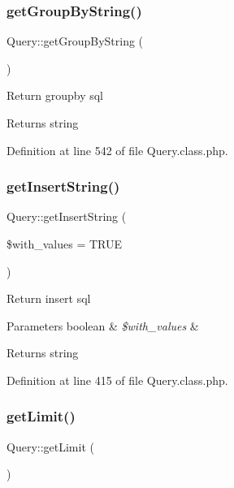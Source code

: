 \subsubsection{\texorpdfstring{get\+Group\+By\+String()}{getGroupByString()}}
{\footnotesize\ttfamily Query\+::get\+Group\+By\+String (\begin{DoxyParamCaption}{ }\end{DoxyParamCaption})}

Return groupby sql \begin{DoxyReturn}{Returns}
string 
\end{DoxyReturn}


Definition at line 542 of file Query.\+class.\+php.

\hypertarget{classQuery_a9e51002db6dbd8743dc9395a42d1d2dc}{}\label{classQuery_a9e51002db6dbd8743dc9395a42d1d2dc} 
\subsubsection{\texorpdfstring{get\+Insert\+String()}{getInsertString()}}
{\footnotesize\ttfamily Query\+::get\+Insert\+String (\begin{DoxyParamCaption}\item[{}]{\$with\+\_\+values = {\ttfamily TRUE} }\end{DoxyParamCaption})}

Return insert sql 
\begin{DoxyParams}[1]{Parameters}
boolean & {\em \$with\+\_\+values} & \\
\hline
\end{DoxyParams}
\begin{DoxyReturn}{Returns}
string 
\end{DoxyReturn}


Definition at line 415 of file Query.\+class.\+php.

\hypertarget{classQuery_a4ce13762176a83bd5b79e162dded72c9}{}\label{classQuery_a4ce13762176a83bd5b79e162dded72c9} 
\subsubsection{\texorpdfstring{get\+Limit()}{getLimit()}}
{\footnotesize\ttfamily Query\+::get\+Limit (\begin{DoxyParamCaption}{ }\end{DoxyParamCaption})}



